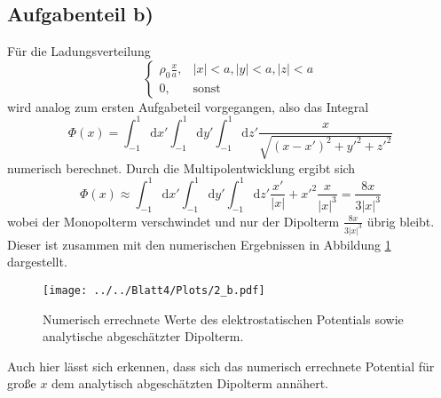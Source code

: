 \subsection*{Aufgabenteil b)}
Für die Ladungsverteilung
\begin{equation}
  \begin{cases}
    \rho_0\frac{x}{a}, & \lvert x \rvert < a, \lvert y \rvert < a, \lvert z \rvert < a \\
    0, & \text{sonst}
  \end{cases}
\end{equation}
wird analog zum ersten Aufgabeteil vorgegangen, also das Integral
\begin{equation}
  \Phi(x)=\int_{-1}^{1}\text{d}x'\int_{-1}^{1}\text{d}y'\int_{-1}^{1}\text{d}z'\frac{x}{\sqrt{(x-x')^2+y'^2+z'^2}}
\end{equation}
numerisch berechnet. Durch die Multipolentwicklung
ergibt sich
\begin{equation}
  \Phi(x)\approx\int_{-1}^{1}\text{d}x'\int_{-1}^{1}\text{d}y'\int_{-1}^{1}\text{d}z'\frac{x'}{\lvert x \rvert}+x'^2\frac{x}{\lvert x \rvert^3} = \frac{8x}{3\lvert x \rvert^3}
\end{equation}
wobei der Monopolterm verschwindet und nur der Dipolterm $\frac{8x}{3\lvert x \rvert^3}$ übrig bleibt. Dieser ist zusammen mit den
numerischen Ergebnissen in Abbildung \ref{fig:Phi_b} dargestellt.
\begin{figure}[H]
  \texttt{[image: ../../Blatt4/Plots/2\_b.pdf]}
  \caption{Numerisch errechnete Werte des elektrostatischen Potentials sowie analytische abgeschätzter Dipolterm.}
  \label{fig:Phi_b}
\end{figure}
Auch hier lässt sich erkennen, dass sich das numerisch errechnete Potential für große $x$ dem analytisch abgeschätzten Dipolterm annähert.
